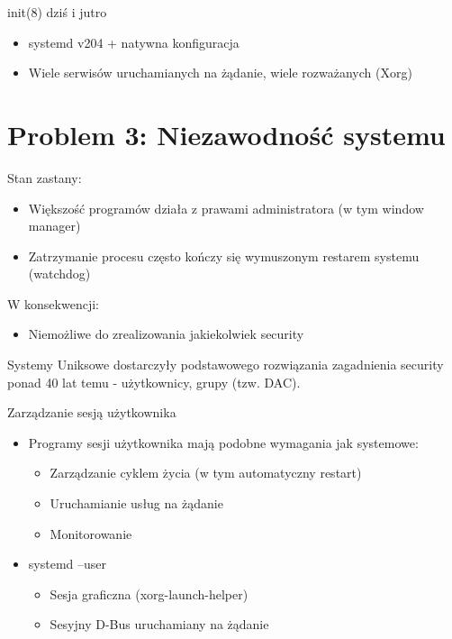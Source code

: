 \documentclass[presentation,aspectratio=43,12pt]{beamer}
\begin{document}
\begin{frame}[label=sec-4-16]{init(8) dziś i jutro}
\begin{itemize}
\item systemd v204 + natywna konfiguracja

\item Wiele serwisów uruchamianych na żądanie, wiele rozważanych (Xorg)
\end{itemize}


\end{frame}

\section{Problem 3: Niezawodność systemu}
\label{sec-5}

\begin{frame}[label=sec-5-1]{Stan zastany:}
\begin{itemize}
\item Większość programów działa z prawami administratora (w tym
window manager)

\item Zatrzymanie procesu często kończy się wymuszonym restarem
systemu (watchdog)
\end{itemize}

\pause
W konsekwencji:
\begin{itemize}
\item Niemożliwe do zrealizowania jakiekolwiek security
\end{itemize}

\pause
Systemy Uniksowe dostarczyły podstawowego rozwiązania zagadnienia
security ponad 40 lat temu - użytkownicy, grupy (tzw. DAC).
\end{frame}

\begin{frame}[label=sec-5-2]{Zarządzanie sesją użytkownika}
\begin{itemize}
\item Programy sesji użytkownika mają podobne wymagania jak systemowe:
\begin{itemize}
\item Zarządzanie cyklem życia (w tym automatyczny restart)
\item Uruchamianie usług na żądanie
\item Monitorowanie
\end{itemize}

\item <2-> systemd --user
\begin{itemize}
\item Sesja graficzna (xorg-launch-helper)
\item Sesyjny D-Bus uruchamiany na żądanie
\end{itemize}
\end{itemize}
\end{frame}
\end{document}
